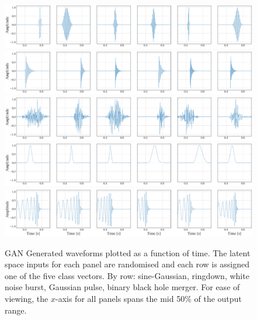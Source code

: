 \documentclass[12pt]{iopart}
\begin{document}
\begin{figure}[!h]
    \centering
    \includegraphics[width=\textwidth]{figures/generations/sg.png}
    \includegraphics[width=\textwidth]{figures/generations/rd.png}
    \includegraphics[width=\textwidth]{figures/generations/wnb.png}
    \includegraphics[width=\textwidth]{figures/generations/blip.png}
    \includegraphics[width=\textwidth]{figures/generations/bbh.png}
    \caption{\ac{GAN} Generated waveforms plotted as a function of time. The latent space inputs for each panel are randomised and each row is assigned one of the five class vectors. By row: sine-Gaussian, ringdown,
white noise burst, Gaussian pulse, binary black hole merger. For ease of viewing, the $x$-axis for all panels spans the mid 50\% of the output range.}
\label{fig:gen_signals} 
\end{figure}
\end{document}
